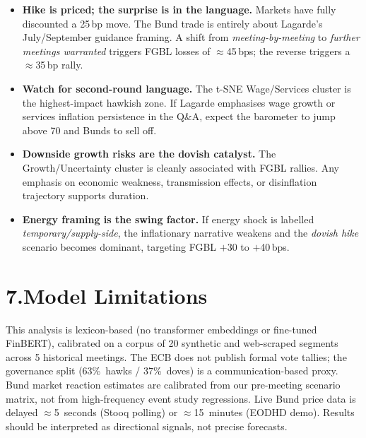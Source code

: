 \documentclass[11pt,a4paper]{article}
\begin{document}
\begin{itemize}[leftmargin=1.2em, itemsep=3pt]
    \item \textbf{Hike is priced; the surprise is in the language.} Markets have fully
    discounted a 25\,bp move. The Bund trade is entirely about Lagarde's July/September
    guidance framing. A shift from \textit{meeting-by-meeting} to \textit{further meetings
    warranted} triggers FGBL losses of $\approx$45\,bps; the reverse triggers a $\approx$35\,bp rally.
    \item \textbf{Watch for second-round language.} The t-SNE Wage/Services cluster is
    the highest-impact hawkish zone. If Lagarde emphasises wage growth or services inflation
    persistence in the Q\&A, expect the barometer to jump above 70 and Bunds to sell off.
    \item \textbf{Downside growth risks are the dovish catalyst.} The Growth/Uncertainty
    cluster is cleanly associated with FGBL rallies. Any emphasis on economic weakness,
    transmission effects, or disinflation trajectory supports duration.
    \item \textbf{Energy framing is the swing factor.} If energy shock is labelled
    \textit{temporary/supply-side}, the inflationary narrative weakens and the
    \textit{dovish hike} scenario becomes dominant, targeting FGBL $+$30 to $+$40\,bps.
\end{itemize}

\section*{7.\quad Model Limitations}

This analysis is lexicon-based (no transformer embeddings or fine-tuned FinBERT),
calibrated on a corpus of 20 synthetic and web-scraped segments across 5 historical meetings.
The ECB does not publish formal vote tallies; the governance split (63\%~hawks / 37\%~doves)
is a communication-based proxy. Bund market reaction estimates are calibrated from our
pre-meeting scenario matrix, not from high-frequency event study regressions.
Live Bund price data is delayed $\approx$5~seconds (Stooq polling) or $\approx$15~minutes
(EODHD demo). Results should be interpreted as directional signals, not precise forecasts.

\vspace{0.5cm}
\end{document}
